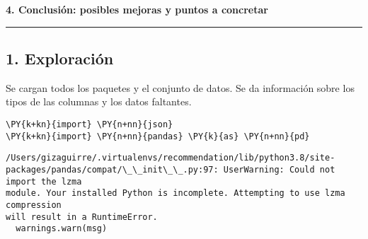 \textbf{4. Conclusión: posibles mejoras y puntos a concretar}

    \begin{center}\rule{0.5\linewidth}{0.5pt}\end{center}

\hypertarget{exploraciuxf3n}{%
\subsection{1. Exploración}\label{exploraciuxf3n}}

Se cargan todos los paquetes y el conjunto de datos. Se da información
sobre los tipos de las columnas y los datos faltantes.

    \begin{tcolorbox}[breakable, size=fbox, boxrule=1pt, pad at break*=1mm,colback=cellbackground, colframe=cellborder]
\begin{Verbatim}[commandchars=\\\{\}]
\PY{k+kn}{import} \PY{n+nn}{json}
\PY{k+kn}{import} \PY{n+nn}{pandas} \PY{k}{as} \PY{n+nn}{pd}
\end{Verbatim}
\end{tcolorbox}

    \begin{Verbatim}[commandchars=\\\{\}]
/Users/gizaguirre/.virtualenvs/recommendation/lib/python3.8/site-
packages/pandas/compat/\_\_init\_\_.py:97: UserWarning: Could not import the lzma
module. Your installed Python is incomplete. Attempting to use lzma compression
will result in a RuntimeError.
  warnings.warn(msg)
    \end{Verbatim}

